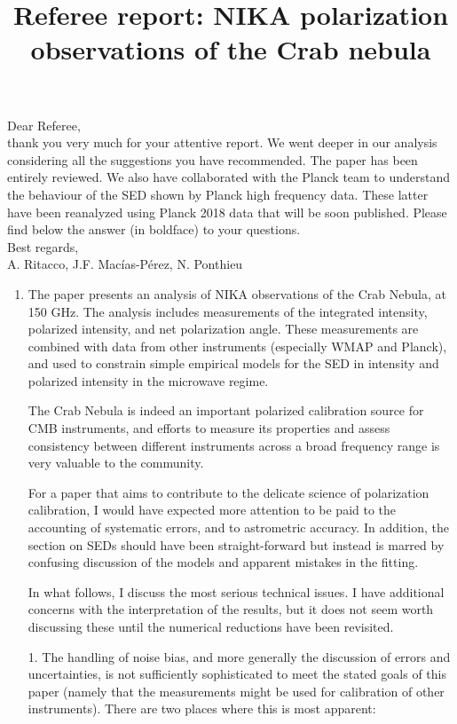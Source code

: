 \documentclass[12pt]{article}
\title{Referee report: NIKA polarization observations of the Crab nebula}
\begin{document}
\maketitle
Dear Referee,\\
thank you very much for your attentive report. 
We went deeper in our analysis considering all the suggestions you have recommended. 
The paper has been entirely reviewed.
We also have collaborated with the Planck team to understand the behaviour of the SED shown by Planck high frequency data. These latter have been reanalyzed using Planck 2018 data that will be soon published. Please find below the answer (in boldface) to your questions.\\
Best regards,\\
A. Ritacco, J.F. Macías-Pérez, N. Ponthieu


\begin{enumerate}
    \item 
The paper presents an analysis of NIKA observations of the Crab
Nebula, at 150 GHz. The analysis includes measurements of the
integrated intensity, polarized intensity, and net polarization angle.
These measurements are combined with data from other instruments
(especially WMAP and Planck), and used to constrain simple empirical
models for the SED in intensity and polarized intensity in the
microwave regime.

The Crab Nebula is indeed an important polarized calibration source
for CMB instruments, and efforts to measure its properties and assess
consistency between different instruments across a broad frequency
range is very valuable to the community.

For a paper that aims to contribute to the delicate science of
polarization calibration, I would have expected more attention to be
paid to the accounting of systematic errors, and to astrometric
accuracy. In addition, the section on SEDs should have been
straight-forward but instead is marred by confusing discussion of the
models and apparent mistakes in the fitting.

In what follows, I discuss the most serious technical issues. I have
additional concerns with the interpretation of the results, but it
does not seem worth discussing these until the numerical reductions
have been revisited.


1. The handling of noise bias, and more generally the discussion of
errors and uncertainties, is not sufficiently sophisticated to meet the
stated goals of this paper (namely that the measurements might be used
for calibration of other instruments). There are two places where
this is most apparent:



\end{enumerate}
\end{document}
